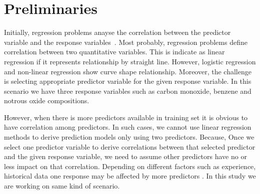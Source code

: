 


\section{Preliminaries} \label{sec-preliminaries}

Initially, regression problems 
anayse the correlation between 
the predictor variable and the response variables~\cite{uyanik2013study}.
Most probably, regression problems define correlation 
between two quantitative variables.
This is indicate as linear regression if it represents 
relationship by straight line. 
However, logistic regression and non-linear regression show curve shape relationship. 
Moreover, the challenge is 
selecting appropriate predictor 
variable for the given response variable. 
In this scenario we have three 
response variables such as 
carbon monoxide, benzene and notrous oxide compositions.

However, when there is more predictors available in training set it is obvious to have correlation among predictors. 
In such cases, we cannot use linear regression methods to 
derive prediction models only using two predictors.
Because, Once we select one predictor variable to derive 
correlations between that 
selected predictor and the given response variable, we need to 
assume other predictors have no or less impact on that correlation.
Depending on different factors such as experience, historical 
data one response may be affected by more predictors \cite{seber2012linear}. 
In this study we are working on same kind of scenario.

